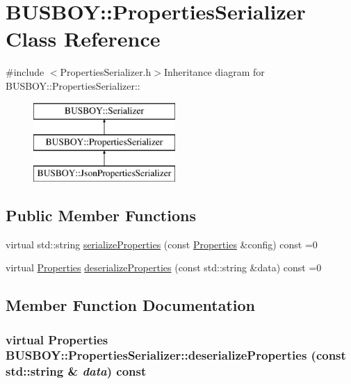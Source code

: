 \hypertarget{classBUSBOY_1_1PropertiesSerializer}{
\section{BUSBOY::PropertiesSerializer Class Reference}
\label{classBUSBOY_1_1PropertiesSerializer}
}


{\ttfamily \#include $<$PropertiesSerializer.h$>$}Inheritance diagram for BUSBOY::PropertiesSerializer::\begin{figure}[H]
\begin{center}
\leavevmode
\includegraphics[height=3cm]{classBUSBOY_1_1PropertiesSerializer}
\end{center}
\end{figure}
\subsection*{Public Member Functions}
\begin{DoxyCompactItemize}
\item 
virtual std::string \hyperlink{classBUSBOY_1_1PropertiesSerializer_abd6db2e7700d60b30f3ff51daff343d9}{serializeProperties} (const \hyperlink{classBUSBOY_1_1Properties}{Properties} \&config) const =0
\item 
virtual \hyperlink{classBUSBOY_1_1Properties}{Properties} \hyperlink{classBUSBOY_1_1PropertiesSerializer_a5568739fc11feeea662fe06ab39194d8}{deserializeProperties} (const std::string \&data) const =0
\end{DoxyCompactItemize}


\subsection{Member Function Documentation}
\hypertarget{classBUSBOY_1_1PropertiesSerializer_a5568739fc11feeea662fe06ab39194d8}{
\subsubsection[{deserializeProperties}]{\setlength{\rightskip}{0pt plus 5cm}virtual {\bf Properties} BUSBOY::PropertiesSerializer::deserializeProperties (const std::string \& {\em data}) const}}
\label{classBUSBOY_1_1PropertiesSerializer_a5568739fc11feeea662fe06ab39194d8}


